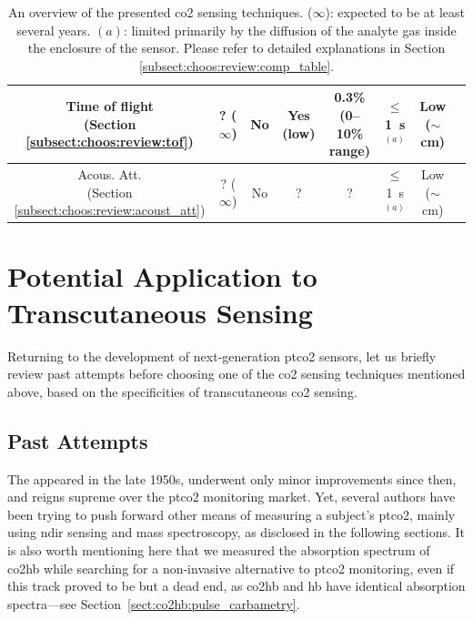 \begin{table}
\begin{tabularx}{\textwidth}{c|c|c|c|c|c|c|c}
		\specialcell{Time of flight\\(Section \ref{subsect:choos:review:tof})} & ? ($\infty$) & No & Yes (low) & \specialcell{0.3\%\\ (0--10\% range)} & $\leq$1~s $^{(a)}$ & Low ($\sim$cm) & \cite{joos1993} \\ \hline
		
		\specialcell{Acous. Att.\\(Section \ref{subsect:choos:review:acoust_att})} & ? ($\infty$) & No & ? & ? & $\leq$1~s $^{(a)}$ & Low ($\sim$cm) & \cite{petculescu2006a, petculescu2006b}
		
	\end{tabularx}
	\caption[An overview of the presented \gls{co2} sensing techniques.]{An overview of the presented \gls{co2} sensing techniques. ($\infty$): expected to be at least several years. $(a)$: limited primarily by the diffusion of the analyte gas inside the enclosure of the sensor. Please refer to detailed explanations in Section \ref{subsect:choos:review:comp_table}.}
	\label{tab:choos:review:resume_techniques}
\end{table}

\section{Potential Application to Transcutaneous Sensing}\label{sect:choos:techno_choice}

Returning to the development of next-generation \gls{ptco2} sensors, let us briefly review past attempts before choosing one of the \gls{co2} sensing techniques mentioned above, based on the specificities of transcutaneous \gls{co2} sensing.

\subsection{Past Attempts}\label{subsect:choos:pot:past_attempts}

The \ssel{} appeared in the late 1950s, underwent only minor improvements since then, and reigns supreme over the \gls{ptco2} monitoring market\cite{severinghaus1986_3, mari2019}. Yet, several authors have been trying to push forward other means of measuring a subject's \gls{ptco2}, mainly using \gls{ndir} sensing and mass spectroscopy, as disclosed in the following sections. It is also worth mentioning here that we measured the absorption spectrum of \gls{co2hb} while searching for a non-invasive alternative to \gls{ptco2} monitoring, even if this track proved to be but a dead end, as \gls{co2hb} and \gls{hb} have identical absorption spectra---see Section~\ref{sect:co2hb:pulse_carbametry}.


